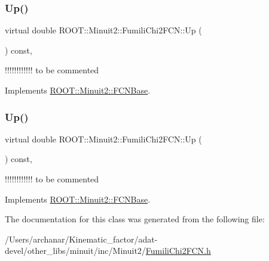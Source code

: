 \subsubsection{\texorpdfstring{Up()}{Up()}\hspace{0.1cm}{\footnotesize\ttfamily [2/3]}}
{\footnotesize\ttfamily virtual double R\+O\+O\+T\+::\+Minuit2\+::\+Fumili\+Chi2\+F\+C\+N\+::\+Up (\begin{DoxyParamCaption}{ }\end{DoxyParamCaption}) const\hspace{0.3cm}{\ttfamily [inline]}, {\ttfamily [virtual]}}

!!!!!!!!!!!! to be commented 

Implements \mbox{\hyperlink{classROOT_1_1Minuit2_1_1FCNBase_a04ef08ddad92ce8d89d498efbe021c39}{R\+O\+O\+T\+::\+Minuit2\+::\+F\+C\+N\+Base}}.

\mbox{\label{classROOT_1_1Minuit2_1_1FumiliChi2FCN_a7e68bc2b2eb631ec52b753d7d49c4414}} 
\subsubsection{\texorpdfstring{Up()}{Up()}\hspace{0.1cm}{\footnotesize\ttfamily [3/3]}}
{\footnotesize\ttfamily virtual double R\+O\+O\+T\+::\+Minuit2\+::\+Fumili\+Chi2\+F\+C\+N\+::\+Up (\begin{DoxyParamCaption}{ }\end{DoxyParamCaption}) const\hspace{0.3cm}{\ttfamily [inline]}, {\ttfamily [virtual]}}

!!!!!!!!!!!! to be commented 

Implements \mbox{\hyperlink{classROOT_1_1Minuit2_1_1FCNBase_a04ef08ddad92ce8d89d498efbe021c39}{R\+O\+O\+T\+::\+Minuit2\+::\+F\+C\+N\+Base}}.



The documentation for this class was generated from the following file\+:\begin{DoxyCompactItemize}
\item 
/\+Users/archanar/\+Kinematic\+\_\+factor/adat-\/devel/other\+\_\+libs/minuit/inc/\+Minuit2/\mbox{\hyperlink{adat-devel_2other__libs_2minuit_2inc_2Minuit2_2FumiliChi2FCN_8h}{Fumili\+Chi2\+F\+C\+N.\+h}}\end{DoxyCompactItemize}
